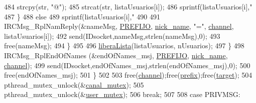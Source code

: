 \begin{DoxyCode}
{{{{{{{484                                                         strcpy(str, \textcolor{stringliteral}{"@"});
485                                                         strcat(str, listaUsuarios[i]);
486                                                         sprintf(listaUsuarios[i],\textcolor{stringliteral}{"%
487                                                 \}
488                                                 \textcolor{keywordflow}{else}
489                                                         sprintf(listaUsuarios[i],\textcolor{stringliteral}{"%
490 
491                                                 IRCMsg\_RplNamReply(&nameMsg,
      \hyperlink{_g-2361-06-_p1-_server_8h_a78c658ff923693099f7b621e7c351129}{PREFIJO}, \hyperlink{_g-2361-06-_p1-_server_8c_aabbf66718cda228b924a4a9441eadf62}{nick\_name}, \textcolor{stringliteral}{"="}, \hyperlink{_g-2361-06-_p1-_server_8c_a842ca2f026578e5c479c095ff3335969}{channel}, listaUsuarios[i]);
492                                                 send(IDsocket,nameMsg,strlen(nameMsg),0);
493                                                 free(nameMsg); 
494                                         \}                                       
495 
496                                         \hyperlink{_g-2361-06-_p1-_functions_8h_a5fa63429b3483f20a469c23625c96820}{liberaLista}(listaUsuarios, nUsuarios);
497                                 \}
498                                 IRCMsg\_RplEndOfNames (&endOfNames\_msj, \hyperlink{_g-2361-06-_p1-_server_8h_a78c658ff923693099f7b621e7c351129}{PREFIJO}, 
      \hyperlink{_g-2361-06-_p1-_server_8c_aabbf66718cda228b924a4a9441eadf62}{nick\_name}, \hyperlink{_g-2361-06-_p1-_server_8c_a842ca2f026578e5c479c095ff3335969}{channel});
499                                 send(IDsocket,endOfNames\_msj,strlen(endOfNames\_msj),0);
500                                 free(endOfNames\_msj);
501                         \}
502 
503                         free(\hyperlink{_g-2361-06-_p1-_server_8c_a842ca2f026578e5c479c095ff3335969}{channel});free(\hyperlink{_g-2361-06-_p1-_server_8c_ad2849cf781a4db22cc1b31eaaee50a4f}{prefix});free(\hyperlink{_g-2361-06-_p1-_server_8c_a23b26cdb3a71f525caf03b57f68d47fa}{target});
504                         pthread\_mutex\_unlock(&\hyperlink{_g-2361-06-_p1-_server_8c_ab86a544a49de18195048bac54dd3ac3e}{canal\_mutex});
505                         pthread\_mutex\_unlock(&\hyperlink{_g-2361-06-_p1-_server_8c_a5dedd07a1144d2ab70b74a8e64b6a7c0}{user\_mutex});
506                         \textcolor{keywordflow}{break};
507 
508                 \textcolor{keywordflow}{case} PRIVMSG:
}}}}}}}}}
\end{DoxyCode}
